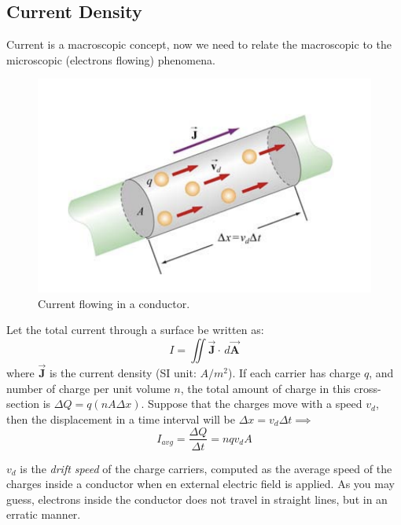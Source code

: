 \documentclass[11pt, letterpaper]{article}
\begin{document}
	\subsection{Current Density}
	Current is a macroscopic concept, now we need to relate the macroscopic to the microscopic (electrons flowing) phenomena.\newpage
	\begin{figure}[h!]
		\centering
		\includegraphics[scale=0.5]{curr-density.png}
		\caption{Current flowing in a conductor.}
		\label{fig:curr-density}
	\end{figure}
	Let the total current through a surface be written as: \[I = \iint\vec{\bm{J}}\cdot\, d\vec{\bm{A}}\] where $\vec{\bm{J}}$ is the current density (SI unit: $A/m^2$). If each carrier has charge $q$, and number of charge per unit volume $n$, the total amount of charge in this cross-section is $\Delta Q = q(nA\Delta x)$. Suppose that the charges move with a speed $v_d$, then the displacement in a time interval will be $\Delta x = v_d\Delta t\implies$
	\begin{equation}\label{eqn:avg-current}
		\boxed{I_{avg} = \frac{\Delta Q}{\Delta t} = nqv_dA}
	\end{equation}

$v_d$ is the \textit{drift speed} of the charge carriers, computed as the average speed of the charges inside a conductor when en external electric field is applied. As you may guess, electrons inside the conductor does not travel in straight lines, but in an erratic manner.
\end{document}
